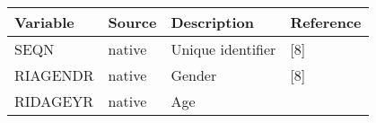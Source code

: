 \documentclass[]{article}
\begin{document}
\begin{longtable}[]{@{}llll@{}}
\toprule
\begin{minipage}[b]{0.10\columnwidth}\raggedright
Variable\strut
\end{minipage} & \begin{minipage}[b]{0.05\columnwidth}\raggedright
Source\strut
\end{minipage} & \begin{minipage}[b]{0.43\columnwidth}\raggedright
Description\strut
\end{minipage} & \begin{minipage}[b]{0.31\columnwidth}\raggedright
Reference\strut
\end{minipage}\tabularnewline
\midrule
\endhead
\begin{minipage}[t]{0.10\columnwidth}\raggedright
SEQN\strut
\end{minipage} & \begin{minipage}[t]{0.05\columnwidth}\raggedright
native\strut
\end{minipage} & \begin{minipage}[t]{0.43\columnwidth}\raggedright
Unique identifier\strut
\end{minipage} & \begin{minipage}[t]{0.31\columnwidth}\raggedright
{[}8{]}\strut
\end{minipage}\tabularnewline
\begin{minipage}[t]{0.10\columnwidth}\raggedright
RIAGENDR\strut
\end{minipage} & \begin{minipage}[t]{0.05\columnwidth}\raggedright
native\strut
\end{minipage} & \begin{minipage}[t]{0.43\columnwidth}\raggedright
Gender\strut
\end{minipage} & \begin{minipage}[t]{0.31\columnwidth}\raggedright
{[}8{]}\strut
\end{minipage}\tabularnewline
\begin{minipage}[t]{0.10\columnwidth}\raggedright
RIDAGEYR\strut
\end{minipage} & \begin{minipage}[t]{0.05\columnwidth}\raggedright
native\strut
\end{minipage} & \begin{minipage}[t]{0.43\columnwidth}\raggedright
Age\strut
\end{minipage} & \begin{minipage}[t]{0.31\columnwidth}\raggedright

\end{minipage}
\end{longtable}
\end{document}
